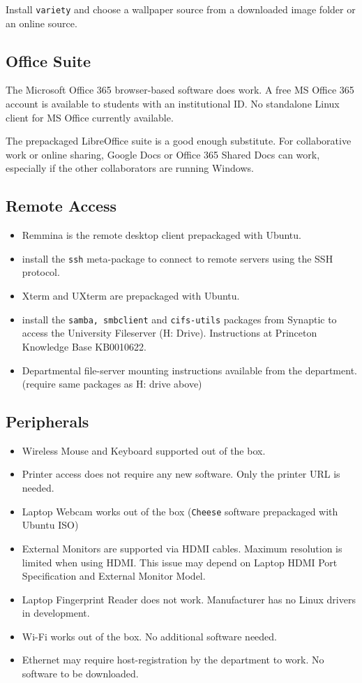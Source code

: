 \documentclass[8pt,letterpaper,twocolumn]{article}
\begin{document}
Install \texttt{variety} and choose a wallpaper source from a downloaded image folder or an online source.
\subsection{Office Suite}

The Microsoft Office 365 browser-based software does work. A free MS Office 365 account is available to students with an institutional ID. No standalone Linux client for MS Office currently available.

The prepackaged LibreOffice suite is a good enough substitute. For collaborative work or online sharing, Google Docs or Office 365 Shared Docs can work, especially if the other collaborators are running Windows.

\subsection{Remote Access}

\begin{itemize}
	\item Remmina is the remote desktop client prepackaged with Ubuntu.
	\item install the \texttt{ssh} meta-package to connect to remote servers using the SSH protocol.
	\item Xterm and UXterm are prepackaged with Ubuntu.
	\item install the \texttt{samba, smbclient} and \texttt{cifs-utils} packages from Synaptic to access the University Fileserver (H: Drive). Instructions at Princeton Knowledge Base KB0010622.
	\item Departmental file-server mounting instructions available from the department. (require same packages as H: drive above)

\end{itemize}

\subsection{Peripherals}

\begin{itemize}
	\item Wireless Mouse and Keyboard supported out of the box.
	\item Printer access does not require any new software. Only the printer URL is needed.
	\item Laptop Webcam works out of the box (\texttt{Cheese} software prepackaged with Ubuntu ISO)
	\item External Monitors are supported via HDMI cables. Maximum resolution is limited when using HDMI. This issue may depend on Laptop HDMI Port Specification and External Monitor Model.
	\item Laptop Fingerprint Reader does not work. Manufacturer has no Linux drivers in development.
	\item Wi-Fi works out of the box. No additional software needed.
	\item Ethernet may require host-registration by the department to work. No software to be downloaded.
\end{itemize}
\end{document}
